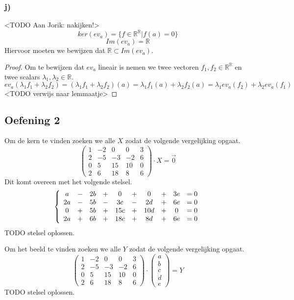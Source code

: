 \documentclass[lineaire_algebra_oplossingen.tex]{subfiles}
\begin{document}
\subsubsection*{j)}
<TODO Aan Jorik: nakijken!>
\[
ker(ev_a) = \{ f \in \mathbb{R}^{\mathbb{R}} | f(a) = 0\}
\]
\[
Im(ev_a) = \mathbb{R}
\]
Hiervoor moeten we bewijzen dat $\mathbb{R} \subset Im(ev_a)$.
\begin{proof}
Om te bewijzen dat $ev_a$ lineair is nemen we twee vectoren $f_1,f_2 \in \mathbb{R}^{\mathbb{R}}$ en twee scalars $\lambda_1, \lambda_2 \in \mathbb{R}$.
\[
ev_a(\lambda_1f_1 + \lambda_2f_2) = (\lambda_1f_1 + \lambda_2f_2)(a) = \lambda_1f_1(a) + \lambda_2f_2(a) = \lambda_1ev_a(f_2) + \lambda_2ev_a(f_1)
\]
<TODO verwijs naar lemmaatje>
\end{proof}

\subsection{Oefening 2}
Om de kern te vinden zoeken we alle $X$ zodat de volgende vergelijking opgaat.
\[
\begin{pmatrix}
1 & -2 & 0 & 0 & 3\\
2 & -5 & -3 & -2 & 6\\
0 & 5 & 15 & 10 & 0\\
2 & 6 & 18 & 8 & 6
\end{pmatrix}
\cdot X
= \vec{0}
\]
Dit komt overeen met het volgende stelsel.
\[
\left\lbrace
\begin{array}{c c c c c c c c c c}
a &-& 2b &+& 0 &+& 0 &+& 3e &= 0\\
2a &-& 5b &-& 3c &-& 2d &+& 6e &= 0\\
0 &+& 5b &+& 15c &+& 10d &+& 0&= 0\\
2a &+& 6b &+& 18c &+& 8d &+& 6e &= 0
\end{array}
\right.
\]
TODO stelsel oplossen.

Om het beeld te vinden zoeken we alle $Y$ zodat de volgende vergelijking opgaat.
\[
\begin{pmatrix}
1 & -2 & 0 & 0 & 3\\
2 & -5 & -3 & -2 & 6\\
0 & 5 & 15 & 10 & 0\\
2 & 6 & 18 & 8 & 6
\end{pmatrix}
\cdot 
\begin{pmatrix}
a\\b\\c\\d\\e
\end{pmatrix}
= Y
\]
TODO stelsel oplossen.
\end{document}

